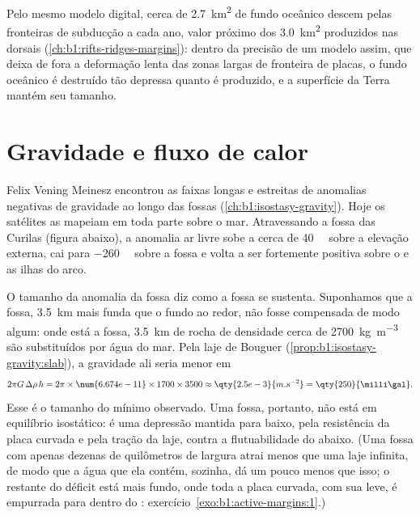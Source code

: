 Pelo mesmo modelo digital, cerca de \qty{2.7}{km^2} de fundo oceânico descem pelas fronteiras de subducção a cada ano, valor próximo dos \qty{3.0}{km^2} produzidos nas dorsais (\cref{ch:b1:rifts-ridges-margins}): dentro da precisão de um modelo assim, que deixa de fora a deformação lenta das zonas largas de fronteira de placas, o fundo oceânico é destruído tão depressa quanto é produzido, e a superfície da Terra mantém seu tamanho.

\section{Gravidade e fluxo de calor}\label{sec:b1:active-margins:gravity-heat}

Felix Vening Meinesz encontrou as faixas longas e estreitas de anomalias negativas de gravidade ao longo das fossas (\cref{ch:b1:isostasy-gravity}). Hoje os satélites as mapeiam em toda parte sobre o mar. Atravessando a fossa das Curilas (figura abaixo), a anomalia ar livre sobe a cerca de \qty{40}{\milli\gal} sobre a elevação externa, cai para \qty{-260}{\milli\gal} sobre a fossa e volta a ser fortemente positiva sobre o  e as ilhas do arco.

O tamanho da anomalia da fossa diz como a fossa se sustenta. Suponhamos que a fossa, \qty{3.5}{km} mais funda que o fundo ao redor, não fosse compensada de modo algum: onde está a fossa, \qty{3.5}{km} de rocha de densidade cerca de \qty{2700}{kg.m^{-3}} são substituídos por água do mar. Pela laje de Bouguer (\cref{prop:b1:isostasy-gravity:slab}), a gravidade ali seria menor em
\[
  2\pi G\,\Delta\rho\,h = 2\pi \times \num{6.674e-11} \times 1700 \times 3500
  \approx \qty{2.5e-3}{m.s^{-2}} = \qty{250}{\milli\gal} .
\]
Esse é o tamanho do mínimo observado. Uma fossa, portanto, não está em equilíbrio isostático: é uma depressão mantida para baixo, pela resistência da placa curvada e pela tração da laje, contra a flutuabilidade do  abaixo. (Uma fossa com apenas dezenas de quilômetros de largura atrai menos que uma laje infinita, de modo que a água que ela contém, sozinha, dá um pouco menos que isso; o restante do déficit está mais fundo, onde toda a placa curvada, com sua  leve, é empurrada para dentro do : exercício~\ref{exo:b1:active-margins:1}.)

